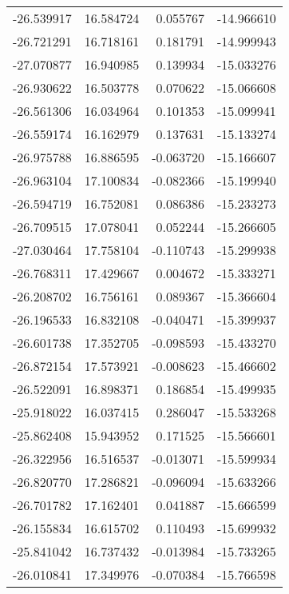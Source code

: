 \begin{tabular}{rrrr}
      -26.539917 &        16.584724 &    0.055767 & -14.966610 \\
      -26.721291 &        16.718161 &    0.181791 & -14.999943 \\
      -27.070877 &        16.940985 &    0.139934 & -15.033276 \\
      -26.930622 &        16.503778 &    0.070622 & -15.066608 \\
      -26.561306 &        16.034964 &    0.101353 & -15.099941 \\
      -26.559174 &        16.162979 &    0.137631 & -15.133274 \\
      -26.975788 &        16.886595 &   -0.063720 & -15.166607 \\
      -26.963104 &        17.100834 &   -0.082366 & -15.199940 \\
      -26.594719 &        16.752081 &    0.086386 & -15.233273 \\
      -26.709515 &        17.078041 &    0.052244 & -15.266605 \\
      -27.030464 &        17.758104 &   -0.110743 & -15.299938 \\
      -26.768311 &        17.429667 &    0.004672 & -15.333271 \\
      -26.208702 &        16.756161 &    0.089367 & -15.366604 \\
      -26.196533 &        16.832108 &   -0.040471 & -15.399937 \\
      -26.601738 &        17.352705 &   -0.098593 & -15.433270 \\
      -26.872154 &        17.573921 &   -0.008623 & -15.466602 \\
      -26.522091 &        16.898371 &    0.186854 & -15.499935 \\
      -25.918022 &        16.037415 &    0.286047 & -15.533268 \\
      -25.862408 &        15.943952 &    0.171525 & -15.566601 \\
      -26.322956 &        16.516537 &   -0.013071 & -15.599934 \\
      -26.820770 &        17.286821 &   -0.096094 & -15.633266 \\
      -26.701782 &        17.162401 &    0.041887 & -15.666599 \\
      -26.155834 &        16.615702 &    0.110493 & -15.699932 \\
      -25.841042 &        16.737432 &   -0.013984 & -15.733265 \\
      -26.010841 &        17.349976 &   -0.070384 & -15.766598 \\

\end{tabular}

